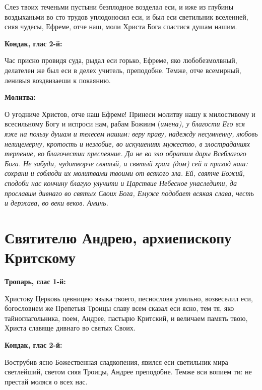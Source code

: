 Слез твоих теченьми пустыни безплодное возделал еси, и иже из глубины воздыханьми во сто трудов уплодоносил еси, и был еси светильник вселенней, сияя чудесы, Ефреме, отче наш, моли Христа Бога спастися душам нашим.


\medskip


\bfseries Кондак, глас 2-й:\normalfont{}


Час присно провидя суда, рыдал еси горько, Ефреме, яко любобезмолвный, делателен же был еси в делех учитель, преподобне. Темже, отче всемирный, ленивыя воздвизаеши к покаянию.


\medskip


\bfseries Молитва:\normalfont{}


О угодниче Христов, отче наш Ефреме! Принеси молитву нашу к милостивому и всесильному Богу и испроси нам, рабам Божиим (\itshape имена\normalfont{}), у благости Его вся яже на пользу душам и телесем нашим: веру праву, надежду несумненну, любовь нелицемерну, кротость и незлобие, во искушениях мужество, в злостраданиях терпение, во благочестии преспеяние. Да не во зло обратим дары Всеблагого Бога. Не забуди, чудотворче святый, и святый храм (дом) сей и приход наш: сохрани и соблюди их молитвами твоими от всякого зла. Ей, святче Божий, сподоби нас кончину благую улучити и Царствие Небесное унаследити, да прославим дивнаго во святых Своих Бога, Емуже подобает всякая слава, честь и держава, во веки веков. Аминь.


\section{Святителю  Андрею, архиепископу Критскому}
 


\bfseries Тропарь, глас 1-й:\normalfont{}


Христову Церковь цевницею языка твоего, песнословя умильно, возвеселил еси, богословием же Препетыя Троицы славу всем сказал еси ясно, тем тя, яко тайноглагольника, поем, Андрее, пастырю Критский, и величаем память твою, Христа славяще дивнаго во святых Своих.


\medskip


\bfseries Кондак, глас 2-й:\normalfont{}


Вострубив ясно Божественная сладкопения, явился еси светильник мира светлейший, светом сияя Троицы, Андрее преподобне. Темже вси вопием ти: не престай моляся о всех нас.


\medskip


